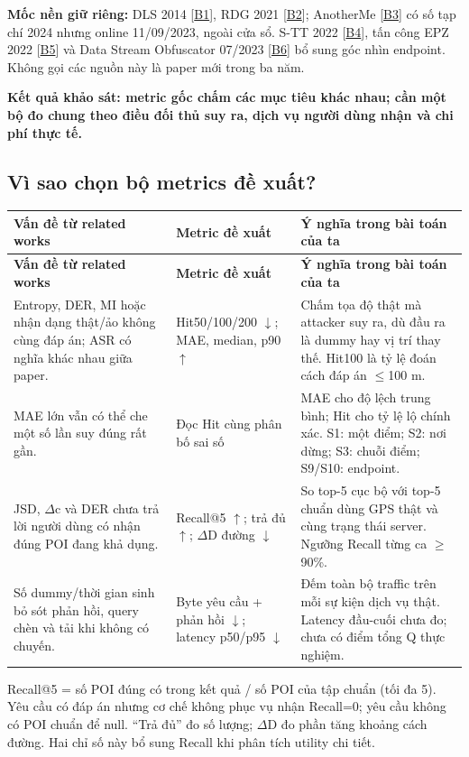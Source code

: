 \documentclass[10pt,a4paper]{article}
\newcommand{\key}[1]{\par\smallskip\noindent\colorbox{pale}{\parbox{\dimexpr\linewidth-2\fboxsep}{\textbf{#1}}}\par\smallskip}
\begin{document}
\endgroup
\textbf{Mốc nền giữ riêng:} DLS 2014 [\hyperlink{ref-B1}{B1}], RDG 2021 [\hyperlink{ref-B2}{B2}]; AnotherMe [\hyperlink{ref-B3}{B3}] có số tạp chí 2024 nhưng online 11/09/2023, ngoài cửa sổ. S-TT 2022 [\hyperlink{ref-B4}{B4}], tấn công EPZ 2022 [\hyperlink{ref-B5}{B5}] và Data Stream Obfuscator 07/2023 [\hyperlink{ref-B6}{B6}] bổ sung góc nhìn endpoint. Không gọi các nguồn này là paper mới trong ba năm.

\key{Kết quả khảo sát: metric gốc chấm các mục tiêu khác nhau; cần một bộ đo chung theo điều đối thủ suy ra, dịch vụ người dùng nhận và chi phí thực tế.}


\clearpage
\subsection{Vì sao chọn bộ metrics đề xuất?}\label{sub:1.1}
\begingroup\small
\begin{longtable}{@{}P{5.513cm}P{4.135cm}P{6.990cm}@{}}
\toprule
\textbf{Vấn đề từ related works} & \textbf{Metric đề xuất} & \textbf{Ý nghĩa trong bài toán của ta}\\\midrule
\endfirsthead
\toprule
\textbf{Vấn đề từ related works} & \textbf{Metric đề xuất} & \textbf{Ý nghĩa trong bài toán của ta}\\\midrule
\endhead
\bottomrule\endfoot
Entropy, DER, MI hoặc nhận dạng thật/ảo không cùng đáp án; ASR có nghĩa khác nhau giữa paper. & Hit50/100/200 $\downarrow$; MAE, median, p90 $\uparrow$ & Chấm tọa độ thật mà attacker suy ra, dù đầu ra là dummy hay vị trí thay thế. Hit100 là tỷ lệ đoán cách đáp án $\le$100 m.\\
\addlinespace[3pt]
MAE lớn vẫn có thể che một số lần suy đúng rất gần. & Đọc Hit cùng phân bố sai số & MAE cho độ lệch trung bình; Hit cho tỷ lệ lộ chính xác. S1: một điểm; S2: nơi dừng; S3: chuỗi điểm; S9/S10: endpoint.\\
\addlinespace[3pt]
JSD, $\Delta$c và DER chưa trả lời người dùng có nhận đúng POI đang khả dụng. & Recall@5 $\uparrow$; trả đủ $\uparrow$; $\Delta$D đường $\downarrow$ & So top-5 cục bộ với top-5 chuẩn dùng GPS thật và cùng trạng thái server. Ngưỡng Recall từng ca $\ge$90\%.\\
\addlinespace[3pt]
Số dummy/thời gian sinh bỏ sót phản hồi, query chèn và tải khi không có chuyến. & Byte yêu cầu + phản hồi $\downarrow$; latency p50/p95 $\downarrow$ & Đếm toàn bộ traffic trên mỗi sự kiện dịch vụ thật. Latency đầu-cuối chưa đo; chưa có điểm tổng Q thực nghiệm.\\
\end{longtable}
\endgroup
Recall@5 = số POI đúng có trong kết quả / số POI của tập chuẩn (tối đa 5). Yêu cầu có đáp án nhưng cơ chế không phục vụ nhận Recall=0; yêu cầu không có POI chuẩn để null. “Trả đủ” đo số lượng; $\Delta$D đo phần tăng khoảng cách đường. Hai chỉ số này bổ sung Recall khi phân tích utility chi tiết.
\end{document}
